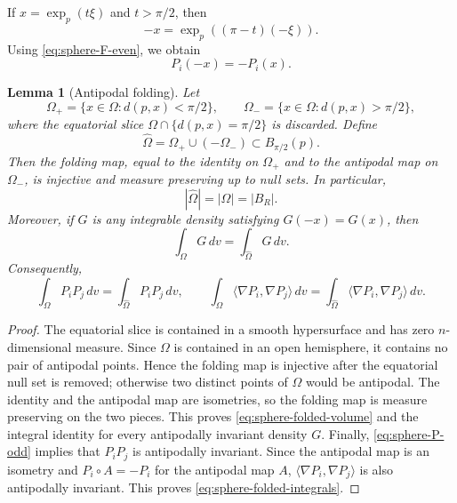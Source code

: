 \documentclass[10pt,a4paper]{amsart}
\newtheorem{lemma}[theorem]{Lemma}
\begin{document}
If $x=\exp_p(t\xi)$ and $t>\pi/2$, then
$$
        -x=\exp_p((\pi-t)(-\xi)).
$$
Using \eqref{eq:sphere-F-even}, we obtain
\begin{equation}\label{eq:sphere-P-odd}
        P_i(-x)=-P_i(x).
\end{equation}

\begin{lemma}[Antipodal folding]\label{lem:sphere-folding}
Let
$$
        \Omega_+=\{x\in\Omega:d(p,x)<\pi/2\},
        \qquad
        \Omega_-=\{x\in\Omega:d(p,x)>\pi/2\},
$$
where the equatorial slice $\Omega\cap\{d(p,x)=\pi/2\}$ is discarded.  Define
\begin{equation}\label{eq:sphere-folded-domain}
        \widehat\Omega=\Omega_+\cup(-\Omega_-)
        \subset B_{\pi/2}(p).
\end{equation}
Then the folding map, equal to the identity on $\Omega_+$ and to the antipodal map on $\Omega_-$, is injective and measure preserving up to null sets.  In particular,
\begin{equation}\label{eq:sphere-folded-volume}
        |\widehat\Omega|=|\Omega|=|B_R|.
\end{equation}
Moreover, if $G$ is any integrable density satisfying $G(-x)=G(x)$, then
$$
        \int_\Omega G\,dv=\int_{\widehat\Omega}G\,dv.
$$
Consequently,
\begin{equation}\label{eq:sphere-folded-integrals}
        \int_\Omega P_iP_j\,dv
        =\int_{\widehat\Omega}P_iP_j\,dv,
        \qquad
        \int_\Omega\langle\nabla P_i,\nabla P_j\rangle\,dv
        =\int_{\widehat\Omega}\langle\nabla P_i,\nabla P_j\rangle\,dv.
\end{equation}
\end{lemma}

\begin{proof}
The equatorial slice is contained in a smooth hypersurface and has zero $n$-dimensional measure.  Since $\Omega$ is contained in an open hemisphere, it contains no pair of antipodal points.  Hence the folding map is injective after the equatorial null set is removed; otherwise two distinct points of $\Omega$ would be antipodal.  The identity and the antipodal map are isometries, so the folding map is measure preserving on the two pieces.  This proves \eqref{eq:sphere-folded-volume} and the integral identity for every antipodally invariant density $G$.  Finally, \eqref{eq:sphere-P-odd} implies that $P_iP_j$ is antipodally invariant.  Since the antipodal map is an isometry and $P_i\circ A=-P_i$ for the antipodal map $A$,  $\langle\nabla P_i,\nabla P_j\rangle$ is also antipodally invariant.  This proves \eqref{eq:sphere-folded-integrals}.
\end{proof}
\end{document}
